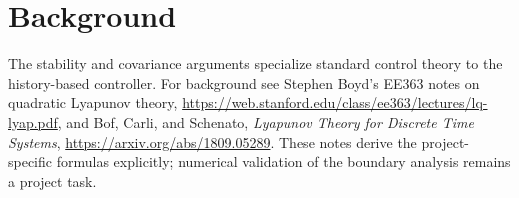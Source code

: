 \documentclass[12 pt]{article}        	%
\theoremstyle{definition}
\begin{document}
\section*{Background}
The stability and covariance arguments specialize standard control theory to the history-based controller. For background see Stephen Boyd's EE363 notes on quadratic Lyapunov theory, \url{https://web.stanford.edu/class/ee363/lectures/lq-lyap.pdf}, and Bof, Carli, and Schenato, \emph{Lyapunov Theory for Discrete Time Systems}, \url{https://arxiv.org/abs/1809.05289}. These notes derive the project-specific formulas explicitly; numerical validation of the boundary analysis remains a project task.
\end{document}
